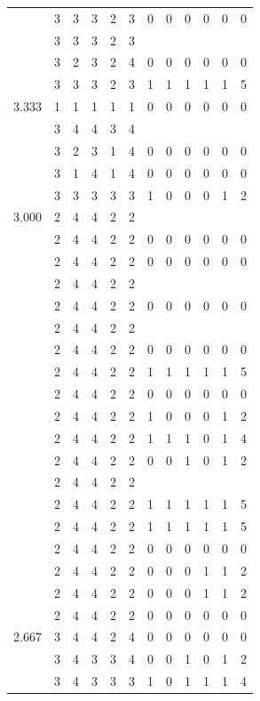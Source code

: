 \documentclass[]{msu-thesis}
\theoremstyle{definition}
\theoremstyle{definition}
\theoremstyle{definition}
\theoremstyle{remark}
\begin{document}
\begin{table}
{\begin{tabular}[t]{rrrrrrrrrrrr}
 & 3 & 3 & 3 & 2 & 3 & 0 & 0 & 0 & 0 & 0 & 0\\
 & 3 & 3 & 3 & 2 & 3 &  &  &  &  &  & \\
 & 3 & 2 & 3 & 2 & 4 & 0 & 0 & 0 & 0 & 0 & 0\\
 & 3 & 3 & 3 & 2 & 3 & 1 & 1 & 1 & 1 & 1 & 5\\
3.333 & 1 & 1 & 1 & 1 & 1 & 0 & 0 & 0 & 0 & 0 & 0\\
 & 3 & 4 & 4 & 3 & 4 &  &  &  &  &  & \\
 & 3 & 2 & 3 & 1 & 4 & 0 & 0 & 0 & 0 & 0 & 0\\
 & 3 & 1 & 4 & 1 & 4 & 0 & 0 & 0 & 0 & 0 & 0\\
 & 3 & 3 & 3 & 3 & 3 & 1 & 0 & 0 & 0 & 1 & 2\\
3.000 & 2 & 4 & 4 & 2 & 2 &  &  &  &  &  & \\
 & 2 & 4 & 4 & 2 & 2 & 0 & 0 & 0 & 0 & 0 & 0\\
 & 2 & 4 & 4 & 2 & 2 & 0 & 0 & 0 & 0 & 0 & 0\\
 & 2 & 4 & 4 & 2 & 2 &  &  &  &  &  & \\
 & 2 & 4 & 4 & 2 & 2 & 0 & 0 & 0 & 0 & 0 & 0\\
 & 2 & 4 & 4 & 2 & 2 &  &  &  &  &  & \\
 & 2 & 4 & 4 & 2 & 2 & 0 & 0 & 0 & 0 & 0 & 0\\
 & 2 & 4 & 4 & 2 & 2 & 1 & 1 & 1 & 1 & 1 & 5\\
 & 2 & 4 & 4 & 2 & 2 & 0 & 0 & 0 & 0 & 0 & 0\\
 & 2 & 4 & 4 & 2 & 2 & 1 & 0 & 0 & 0 & 1 & 2\\
 & 2 & 4 & 4 & 2 & 2 & 1 & 1 & 1 & 0 & 1 & 4\\
 & 2 & 4 & 4 & 2 & 2 & 0 & 0 & 1 & 0 & 1 & 2\\
 & 2 & 4 & 4 & 2 & 2 &  &  &  &  &  & \\
 & 2 & 4 & 4 & 2 & 2 & 1 & 1 & 1 & 1 & 1 & 5\\
 & 2 & 4 & 4 & 2 & 2 & 1 & 1 & 1 & 1 & 1 & 5\\
 & 2 & 4 & 4 & 2 & 2 & 0 & 0 & 0 & 0 & 0 & 0\\
 & 2 & 4 & 4 & 2 & 2 & 0 & 0 & 0 & 1 & 1 & 2\\
 & 2 & 4 & 4 & 2 & 2 & 0 & 0 & 0 & 1 & 1 & 2\\
 & 2 & 4 & 4 & 2 & 2 & 0 & 0 & 0 & 0 & 0 & 0\\
2.667 & 3 & 4 & 4 & 2 & 4 & 0 & 0 & 0 & 0 & 0 & 0\\
 & 3 & 4 & 3 & 3 & 4 & 0 & 0 & 1 & 0 & 1 & 2\\
 & 3 & 4 & 3 & 3 & 3 & 1 & 0 & 1 & 1 & 1 & 4\\

\end{tabular}}
\end{table}
\end{document}

